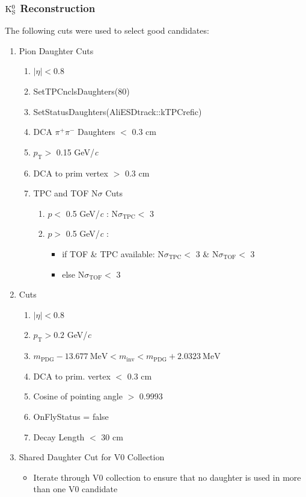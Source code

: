 \documentclass[../AnalysisNoteJBuxton.tex]{subfiles}
\begin{document}
\subsubsection{\texorpdfstring{$\rm K^{0}_{S}$}{TEXT} Reconstruction}
\label{K0sReconstruction}

The following cuts were used to select good \Ks candidates:

\begin{enumerate}
 \item{Pion Daughter Cuts}
 \begin{enumerate}
  \item $|\eta| < 0.8$
  \item SetTPCnclsDaughters(80)
  \item SetStatusDaughters(AliESDtrack::kTPCrefic)
  \item DCA $\pi^{+}\pi^{-}$ Daughters $<$ 0.3 cm
  \item $p_{\mathrm{T}} >$ 0.15 GeV/\textit{c}
  \item DCA to prim vertex $>$ 0.3 cm
   \item TPC and TOF N$\sigma$ Cuts
   \begin{enumerate}
    \item $p <$ 0.5 GeV/\textit{c} : N$\sigma_{\mathrm{TPC}} <$ 3
    \item $p >$ 0.5 GeV/\textit{c} :
    \begin{itemize}
     \item if TOF \& TPC available: N$\sigma_{\mathrm{TPC}} <$ 3 \& N$\sigma_{\mathrm{TOF}} <$ 3
     \item else N$\sigma_{\mathrm{TOF}} <$ 3
    \end{itemize}
   \end{enumerate}  
 \end{enumerate}

 \item \Ks Cuts
 \begin{enumerate}
  \item $|\eta| < 0.8$
  \item $p_{\mathrm{T}} > 0.2$ GeV/\textit{c}
  \item $m_{\mathrm{PDG}}-13.677 \ \mathrm{MeV} < m_{\mathrm{inv}} < m_{\mathrm{PDG}} + 2.0323 \ \mathrm{MeV}$
  \item DCA to prim. vertex $<$ 0.3 cm
  \item Cosine of pointing angle $>$ 0.9993
  \item OnFlyStatus = false
  \item Decay Length $<$ 30 cm
 \end{enumerate}  
 \item Shared Daughter Cut for V0 Collection
 \begin{itemize}
  \item Iterate through V0 collection to ensure that no daughter is used in more than one V0 candidate
 \end{itemize} 
\end{enumerate}
\end{document}
